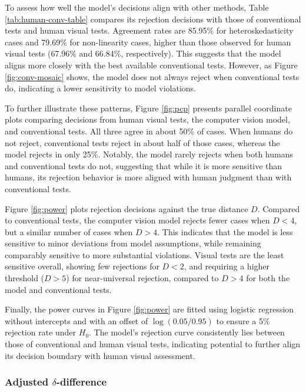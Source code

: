 \documentclass[]{interact}
\theoremstyle{plain}%
\theoremstyle{definition}
\theoremstyle{remark}
\begin{document}
To assess how well the model's decisions align with other methods, Table
\ref{tab:human-conv-table} compares its rejection decisions with those
of conventional tests and human visual tests. Agreement rates are
85.95\% for heteroskedasticity cases and 79.69\% for non-linearity
cases, higher than those observed for human visual tests (67.96\% and
66.84\%, respectively). This suggests that the model aligns more closely
with the best available conventional tests. However, as Figure
\ref{fig:conv-mosaic} shows, the model does not always reject when
conventional tests do, indicating a lower sensitivity to model
violations.

To further illustrate these patterns, Figure \ref{fig:pcp} presents
parallel coordinate plots comparing decisions from human visual tests,
the computer vision model, and conventional tests. All three agree in
about 50\% of cases. When humans do not reject, conventional tests
reject in about half of those cases, whereas the model rejects in only
25\%. Notably, the model rarely rejects when both humans and
conventional tests do not, suggesting that while it is more sensitive
than humans, its rejection behavior is more aligned with human judgment
than with conventional tests.

Figure \ref{fig:power} plots rejection decisions against the true
distance \(D\). Compared to conventional tests, the computer vision
model rejects fewer cases when \(D < 4\), but a similar number of cases
when \(D > 4\). This indicates that the model is less sensitive to minor
deviations from model assumptions, while remaining comparably sensitive
to more substantial violations. Visual tests are the least sensitive
overall, showing few rejections for \(D < 2\), and requiring a higher
threshold (\(D > 5\)) for near-universal rejection, compared to
\(D > 4\) for both the model and conventional tests.

Finally, the power curves in Figure \ref{fig:power} are fitted using
logistic regression without intercepts and with an offset of
\(\log(0.05/0.95)\) to ensure a 5\% rejection rate under \(H_0\). The
model's rejection curve consistently lies between those of conventional
and human visual tests, indicating potential to further align its
decision boundary with human visual assessment.

\subsubsection{\texorpdfstring{Adjusted
\(\delta\)-difference}{Adjusted \textbackslash delta-difference}}\label{adjusted-delta-difference}
\end{document}
